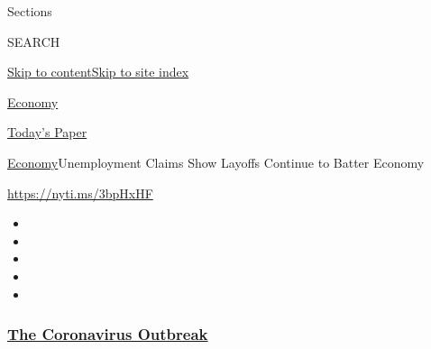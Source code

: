 Sections

SEARCH

\protect\hyperlink{site-content}{Skip to
content}\protect\hyperlink{site-index}{Skip to site index}

\href{https://www.nytimes3xbfgragh.onion/section/business/economy}{Economy}

\href{https://myaccount.nytimes3xbfgragh.onion/auth/login?response_type=cookie\&client_id=vi}{}

\href{https://www.nytimes3xbfgragh.onion/section/todayspaper}{Today's
Paper}

\href{/section/business/economy}{Economy}\textbar{}Unemployment Claims
Show Layoffs Continue to Batter Economy

\url{https://nyti.ms/3bpHxHF}

\begin{itemize}
\item
\item
\item
\item
\item
\end{itemize}

\hypertarget{the-coronavirus-outbreak}{%
\subsubsection{\texorpdfstring{\href{https://www.nytimes3xbfgragh.onion/news-event/coronavirus?name=styln-coronavirus-markets\&region=TOP_BANNER\&block=storyline_menu_recirc\&action=click\&pgtype=Article\&impression_id=95f37bc0-f2a1-11ea-9113-131123c250e5\&variant=undefined}{The
Coronavirus
Outbreak}}{The Coronavirus Outbreak}}\label{the-coronavirus-outbreak}}

